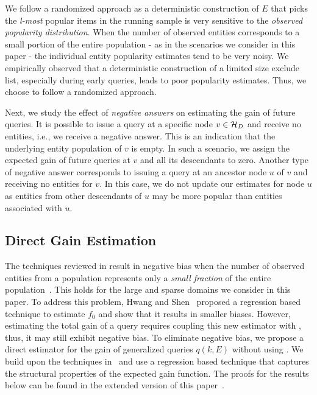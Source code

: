 We follow a randomized approach as a deterministic construction of $E$ that picks the {\em l-most} popular items in the running sample is very sensitive to the {\em observed popularity distribution}. When the number of observed entities corresponds to a small portion of the entire population - as in the scenarios we consider in this paper - the individual entity popularity estimates tend to be very noisy.  We empirically observed that a deterministic construction of a limited size exclude list, especially during early queries, leads to poor popularity estimates. Thus, we choose to follow a randomized approach.

Next, we study the effect of {\em negative answers} on estimating the gain of future queries. It is possible to issue a query at a specific node $v \in \mathcal{H}_D$ and receive no entities, i.e., we receive a negative answer. This is an indication that the underlying entity population of $v$ is empty. In such a scenario, we assign the expected gain of future queries at $v$ and all its descendants to zero. Another type of negative answer corresponds to issuing a query at an ancestor node $u$ of $v$ and receiving no entities for $v$. In this case, we do not update our estimates for node $u$ as entities from other descendants of $u$ may be more popular than entities associated with $u$.

\subsection{Direct Gain Estimation}
\label{sec:newestim}
The techniques reviewed in  result in negative bias when the number of observed entities from a population represents only a {\em small fraction} of the entire population~\cite{hwang:2010, shen:2003}. This holds for the large and sparse domains we consider in this paper. To address this problem, Hwang and Shen~\cite{hwang:2010} proposed a regression based technique to estimate $f_0$ and show that it results in smaller biases. However, estimating the total gain of a query requires coupling this new estimator with , thus, it may still exhibit negative bias. To eliminate negative bias, we propose a direct estimator for the gain of generalized queries $q(k,E)$ without using . We build upon the techniques in~\cite{hwang:2010} and use a regression based technique that captures the structural properties of the expected gain function. \ifpaper The proofs for the results below can be found in the extended version of this paper~\cite{crowdgatherfull}. \fi

